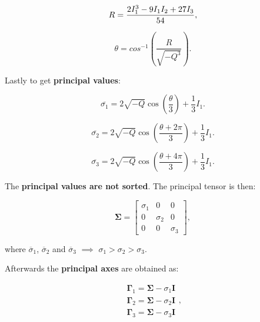 \begin{itemize}
        \begin{equation}
            R = \frac{2 I_{1}^{3} - 9 I_{1} I_{2} + 27 I_{3}}{54} \\
        ,\end{equation}

        \begin{equation}
            \theta = cos^{-1} \left( \frac{ R }{ \sqrt{- Q^{3}}} \right)
        .\end{equation}

        Lastly to get \textbf{principal values}:

        \begin{equation}
            \overline{\sigma_{1}}
            = 2 \sqrt{-Q} \cos{\left(\frac{\theta}{3}\right)} + \frac{1}{3}I_{1}
        .\end{equation}

        \begin{equation}
            \overline{\sigma_{2}}
            = 2 \sqrt{-Q} \cos{\left(\frac{\theta + 2 \pi}{3}\right)} + \frac{1}{3}I_{1}
        .\end{equation}

        \begin{equation}
            \overline{\sigma_{3}}
            = 2 \sqrt{-Q} \cos{\left(\frac{\theta + 4 \pi}{3}\right)} + \frac{1}{3}I_{1}
        .\end{equation}

        The \textbf{principal values are not sorted}. The principal tensor is then:

        \begin{equation}
            \mathbf{\Sigma} = \begin{bmatrix}
                \sigma_{1} & 0 & 0 \\
                0 & \sigma_{2}  & 0 \\
                0 & 0 & \sigma_{3}
            \end{bmatrix}
        ,\end{equation}

        where $\overline{\sigma}_{1}$, $\overline{\sigma}_{2}$ and $\overline{\sigma}_{3}$
        $\implies$ $\sigma_1 > \sigma_2 > \sigma_3$.

        Afterwards the \textbf{principal axes} are obtained as:

        \begin{equation}
            \begin{array}{l}
                \mathbf{\Gamma}_{1} = \mathbf{\Sigma} - \sigma_{1}\mathbf{I} \\
                \mathbf{\Gamma}_{2} = \mathbf{\Sigma} - \sigma_{2}\mathbf{I} \\
                \mathbf{\Gamma}_{3} = \mathbf{\Sigma} - \sigma_{3}\mathbf{I}
            \end{array}
        ,\end{equation}


\end{itemize}
